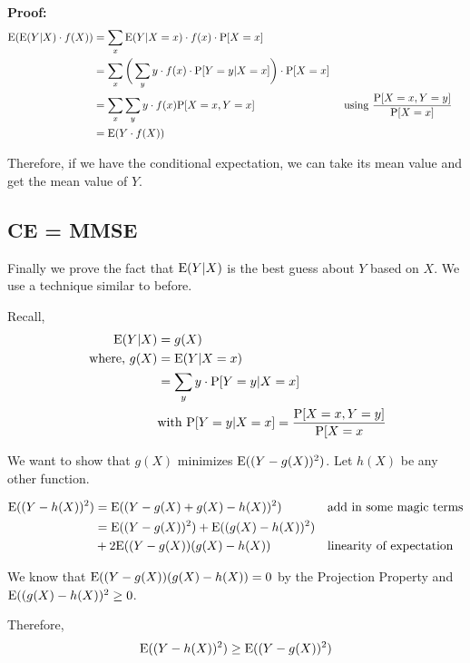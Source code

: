 \documentclass{exam}
\begin{document}
\textbf{Proof:}
\begin{align*}
\text{E}(\text{E}(Y | X) \cdot f(X)) &= \sum_{x} \text{E}(Y | X = x) \cdot f(x) \cdot \text{P}[X = x]\\
&= \sum_{x} \bigg(\sum_{y} y \cdot f(x) \cdot \text{P}[Y = y | X = x] \bigg) \cdot \text{P}[X = x]\\
&= \sum_x \sum_y y \cdot f(x) \text{P}[X = x, Y = x] && \text{ using $\frac{\text{P}[X=x, Y=y]}{\text{P}[X=x]}$}\\
&= \text{E}(Y \cdot f(X))
\end{align*}

Therefore, if we have the conditional expectation, we can take its mean value and get the mean value of $Y$.

\clearpage

\subsection{CE = MMSE}
Finally we prove the fact that $\text{E}(Y | X)$ is the best guess about $Y$ based on $X$. We use a technique similar to before.

Recall, 
\begin{align*}
\text{E}(Y | X) &= g(X) \\
\text{ where, } g(X) &= \text{E}(Y | X = x) \\
&= \sum_{y} y \cdot \text{P}[Y=y | X = x] \\
&\text{with } \text{P}[Y=y | X=x] = \frac{\text{P}[X=x, Y=y]}{\text{P}[X=x}
\end{align*}

We want to show that $g(X)$ minimizes $\text{E}((Y - g(X))^2)$. Let $h(X)$ be any other function.

\begin{align*}
\text{E}((Y - h(X))^2) &= \text{E}((Y - g(X) + g(X) - h(X))^2) && \text{add in some magic terms}\\
&= \text{E}((Y - g(X))^2) + \text{E}((g(X) - h(X))^2) \\
&+ 2\text{E}((Y - g(X))(g(X)-h(X)) && \text{linearity of expectation}\\
\end{align*}

We know that $\text{E}((Y - g(X))(g(X)-h(X)) = 0$ by the Projection Property and $\text{E}((g(X) - h(X))^2 \geq 0$.

Therefore, 
\[\text{E}((Y - h(X))^2) \geq \text{E}((Y - g(X))^2)\]
\end{document}
